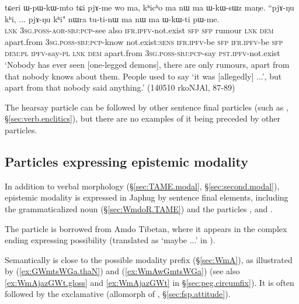 \begin{exe}
\ex \label{ex:khicho}
\gll  tɕeri ɯ-pɯ-kɯ-mto tɕi pjɤ-me wo ma, kʰicʰo ma nɯ ma ɯ-kɯ-sɯz maŋe. ``pjɤ-ŋu kʰi, ... pjɤ-ŋu kʰi" nɯra tu-ti-nɯ ma nɯ ma ɯ-kɯ-ti pɯ-me. \\
\textsc{lnk} \textsc{3sg}.\textsc{poss}-\textsc{aor}-\textsc{sbj}:\textsc{pcp}-see also \textsc{ifr}.\textsc{ipfv}-not.exist \textsc{sfp} \textsc{sfp} rumour \textsc{lnk} \textsc{dem} apart.from \textsc{3sg}.\textsc{poss}-\textsc{sbj}:\textsc{pcp}-know not.exist:\textsc{sens}  \textsc{ifr}.\textsc{ipfv}-be \textsc{sfp} {   } \textsc{ifr}.\textsc{ipfv}-be \textsc{sfp} \textsc{dem}:\textsc{pl} \textsc{ipfv}-say-\textsc{pl} \textsc{lnk} \textsc{dem} apart.from \textsc{3sg}.\textsc{poss}-\textsc{sbj}:\textsc{pcp}-say \textsc{pst}.\textsc{ipfv}-not.exist \\
\glt `Nobody has ever seen [one-legged demons], there are only rumours, apart from that nobody knows about them. People used to say `it was [allegedly] ...', but apart from that nobody said anything.' (140510 rkoNJAl, 87-89)
 \end{exe}
 
The hearsay particle can be followed by other sentence final particles (such as , §\ref{sec:verb.enclitics}), but there are no examples of it being preceded by other particles.
 
\subsection{Particles expressing epistemic modality} \label{sec:fsp.epistemic}
In addition to verbal morphology (§\ref{sec:TAME.modal}, §\ref{sec:second.modal}), epistemic modality is expressed in Japhug by sentence final elements, including the grammaticalized noun  (§\ref{sec:WmdoR.TAME}) and the particles ,  and .

The particle  is borrowed from Amdo Tibetan, where it appears in the complex ending  expressing possibility (translated as  `maybe ...' in \citealt[306--307]{ebihara19amdo}). 

Semantically  is close to the possible modality prefix (§\ref{sec:WmA}), as illustrated by (\ref{ex:GWmtsWGa.thaN}) and (\ref{ex:WmAwGmtsWGa}) (see also  \ref{ex:WmAjazGWt.gloss} and \ref{ex:WmAjazGWt} in §\ref{sec:peg.circumfix}). It is often followed by the exclamative  (allomorph of , §\ref{sec:fsp.attitude}).
  
